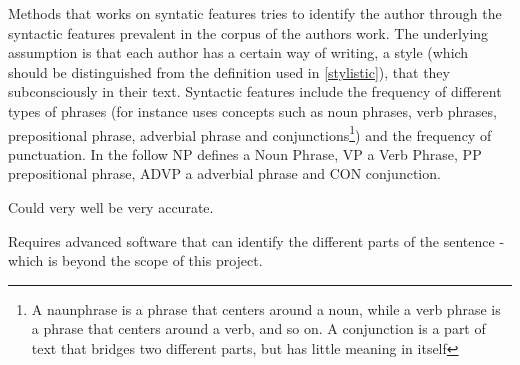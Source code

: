{\label{syntactic}
Methods that works on syntatic features tries to identify the author through the syntactic
features prevalent in the corpus of the authors
work. The underlying assumption is that each author has a certain way of writing, a style (which should be distinguished from the definition used in \ref{stylistic}), that they subconsciously in their text. Syntactic features include the frequency of different types of phrases (for instance \cite{style} uses concepts such as noun phrases, verb phrases, prepositional phrase, adverbial phrase and conjunctions\footnote{A naunphrase is a phrase that centers around a noun, while a verb phrase is a phrase that centers around a verb, and so on. A conjunction is a part of text that bridges two different parts, but has little meaning in itself}) and the frequency of punctuation.
} 
{
In the follow NP defines a Noun Phrase, VP a Verb Phrase, PP prepositional phrase, ADVP a adverbial phrase and CON conjunction.\\
}
{
\item Could very well be very accurate.
}{
\item Requires advanced software that can identify the different parts of the sentence - which is beyond the scope of this project.

}


